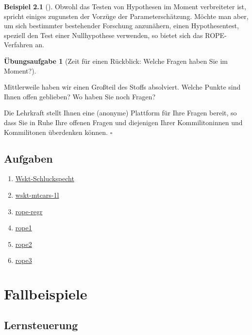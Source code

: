 \documentclass[
  ngerman,
  letterpaper,
  twoside,
  open=any]{scrbook}
\providecommand{\tightlist}{%
  \setlength{\itemsep}{0pt}\setlength{\parskip}{0pt}}\usepackage{longtable,booktabs,array}
\theoremstyle{definition}
\newtheorem{example}{Beispiel}[chapter]
\theoremstyle{plain}
\theoremstyle{definition}
\newtheorem{exercise}{Übungsaufgabe}[chapter]
\theoremstyle{definition}
\theoremstyle{remark}
\begin{document}
\begin{example}[]
Obwohl das Testen von Hypothesen im Moment verbreiteter ist, spricht
einiges zugunsten der Vorzüge der Parameterschätzung. Möchte man aber,
um sich bestimmter bestehender Forschung anzunähern, einen
Hypothesentest, speziell den Test einer Nullhypothese verwenden, so
bietet sich das ROPE-Verfahren an.

\begin{exercise}[Zeit für einen Rückblick: Welche Fragen haben Sie im
Moment?]\protect\hypertarget{exr-fragjetzt-schaetzen}{}\label{exr-fragjetzt-schaetzen}

Mittlerweile haben wir einen Großteil des Stoffs absolviert. Welche
Punkte sind Ihnen offen geblieben? Wo haben Sie noch Fragen?

Die Lehrkraft stellt Ihnen eine (anonyme) Plattform für Ihre Fragen
bereit, so dass Sie in Ruhe Ihre offenen Fragen und diejenigen Ihrer
Kommilitoninnen und Kommilitonen überdenken können. \(\square\)

\end{exercise}

\section{Aufgaben}\label{aufgaben-9}

\begin{enumerate}
\def\labelenumi{\arabic{enumi}.}
\tightlist
\item
  \href{https://datenwerk.netlify.app/posts/wskt-schluckspecht/wskt-schluckspecht}{Wskt-Schluckspecht}
\item
  \href{https://datenwerk.netlify.app/posts/wskt-mtcars-1l/wskt-mtcars-1l.html}{wskt-mtcars-1l}
\item
  \href{https://datenwerk.netlify.app/posts/rope-regr/rope-regr.html}{rope-regr}
\item
  \href{https://datenwerk.netlify.app/posts/rope1/rope1.html}{rope1}
\item
  \href{https://datenwerk.netlify.app/posts/rope2/rope2.html}{rope2}
\item
  \href{https://datenwerk.netlify.app/posts/rope3/rope3.html}{rope3}
\end{enumerate}

\chapter{Fallbeispiele}\label{fallbeispiele}

\section{Lernsteuerung}\label{lernsteuerung-10}


\end{example}
\end{document}
